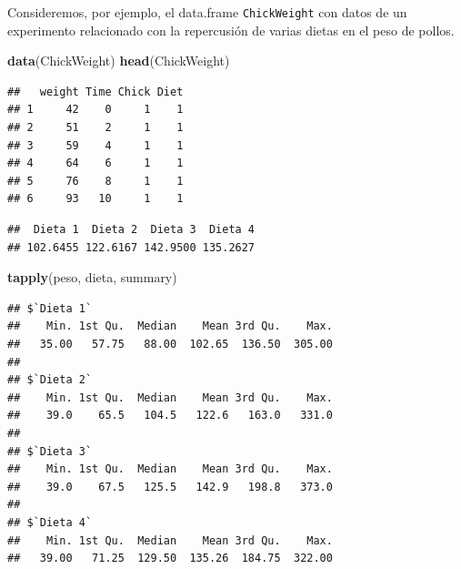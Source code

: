 \documentclass[]{book}
\newenvironment{Shaded}{\begin{snugshade}}{\end{snugshade}}
\newcommand{\CommentTok}[1]{\textcolor[rgb]{0.56,0.35,0.01}{\textit{#1}}}
\newcommand{\KeywordTok}[1]{\textcolor[rgb]{0.13,0.29,0.53}{\textbf{#1}}}
\newcommand{\NormalTok}[1]{#1}
\newcommand{\OperatorTok}[1]{\textcolor[rgb]{0.81,0.36,0.00}{\textbf{#1}}}
\newcommand{\StringTok}[1]{\textcolor[rgb]{0.31,0.60,0.02}{#1}}
\begin{document}
Consideremos, por ejemplo, el data.frame \texttt{ChickWeight} con datos de un
experimento relacionado con la repercusión de varias dietas en el peso
de pollos.

\begin{Shaded}
\begin{Highlighting}[]
\KeywordTok{data}\NormalTok{(ChickWeight)}
\KeywordTok{head}\NormalTok{(ChickWeight)}
\end{Highlighting}
\end{Shaded}

\begin{verbatim}
##   weight Time Chick Diet
## 1     42    0     1    1
## 2     51    2     1    1
## 3     59    4     1    1
## 4     64    6     1    1
## 5     76    8     1    1
## 6     93   10     1    1
\end{verbatim}

\begin{Shaded}
\end{Shaded}

\begin{verbatim}
##  Dieta 1  Dieta 2  Dieta 3  Dieta 4 
## 102.6455 122.6167 142.9500 135.2627
\end{verbatim}

\begin{Shaded}
\begin{Highlighting}[]
\KeywordTok{tapply}\NormalTok{(peso, dieta, summary)}
\end{Highlighting}
\end{Shaded}

\begin{verbatim}
## $`Dieta 1`
##    Min. 1st Qu.  Median    Mean 3rd Qu.    Max. 
##   35.00   57.75   88.00  102.65  136.50  305.00 
## 
## $`Dieta 2`
##    Min. 1st Qu.  Median    Mean 3rd Qu.    Max. 
##    39.0    65.5   104.5   122.6   163.0   331.0 
## 
## $`Dieta 3`
##    Min. 1st Qu.  Median    Mean 3rd Qu.    Max. 
##    39.0    67.5   125.5   142.9   198.8   373.0 
## 
## $`Dieta 4`
##    Min. 1st Qu.  Median    Mean 3rd Qu.    Max. 
##   39.00   71.25  129.50  135.26  184.75  322.00
\end{verbatim}
\end{document}
